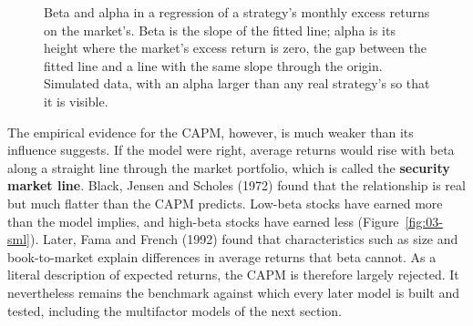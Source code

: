 \begin{figure}[!htbp]
\caption{Beta and alpha in a regression of a strategy's monthly excess returns on the market's. Beta is the slope of the fitted line; alpha is its height where the market's excess return is zero, the gap between the fitted line and a line with the same slope through the origin. Simulated data, with an alpha larger than any real strategy's so that it is visible.}
\label{fig:03-alpha}
\end{figure}

The empirical evidence for the CAPM, however, is much weaker than its influence suggests. If the model were right, average returns would rise with beta along a straight line through the market portfolio, which is called the \textbf{security market line}. Black, Jensen and Scholes (1972) found that the relationship is real but much flatter than the CAPM predicts. Low-beta stocks have earned more than the model implies, and high-beta stocks have earned less (Figure~\ref{fig:03-sml}). Later, Fama and French (1992) found that characteristics such as size and book-to-market explain differences in average returns that beta cannot. As a literal description of expected returns, the CAPM is therefore largely rejected. It nevertheless remains the benchmark against which every later model is built and tested, including the multifactor models of the next section.


